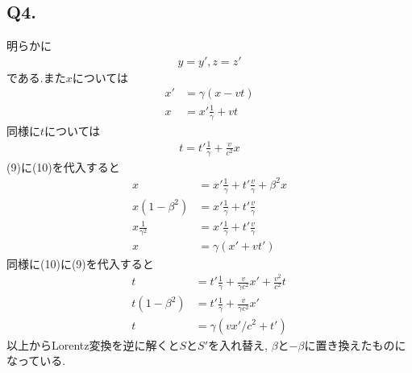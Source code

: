 \documentclass[uplatex,a4j,11pt,dvipdfmx]{jsarticle}
\begin{document}
\subsection*{Q4.}
明らかに
\begin{align*}
  y=y',z=z'
\end{align*}
である.また$x$については
\begin{align}
  x'&=\gamma(x-vt)\nonumber\\
  x&=x'\frac{1}{\gamma}+vt
\end{align}
同様に$t$については
\begin{align}
  t=t'\frac{1}{\gamma}+\frac{v}{c^2}x
\end{align}
(9)に(10)を代入すると
\begin{align*}
  x&=x'\frac{1}{\gamma}+t'\frac{v}{\gamma}+\beta^2x\\
  x(1-\beta^2)&=x'\frac{1}{\gamma}+t'\frac{v}{\gamma}\\
  x\frac{1}{\gamma^2}&=x'\frac{1}{\gamma}+t'\frac{v}{\gamma}\\
  x&=\gamma(x'+vt')
\end{align*}
同様に(10)に(9)を代入すると
\begin{align*}
  t&=t'\frac{1}{\gamma}+\frac{v}{\gamma c^2}x'+\frac{v^2}{c^2}t\\
  t(1-\beta^2)&=t'\frac{1}{\gamma}+\frac{v}{\gamma c^2}x'\\
  t&=\gamma(vx'/c^2+t')
\end{align*}
以上からLorentz変換を逆に解くと$S$と$S'$を入れ替え,
$\beta$と$-\beta$に置き換えたものになっている.

\end{document}
